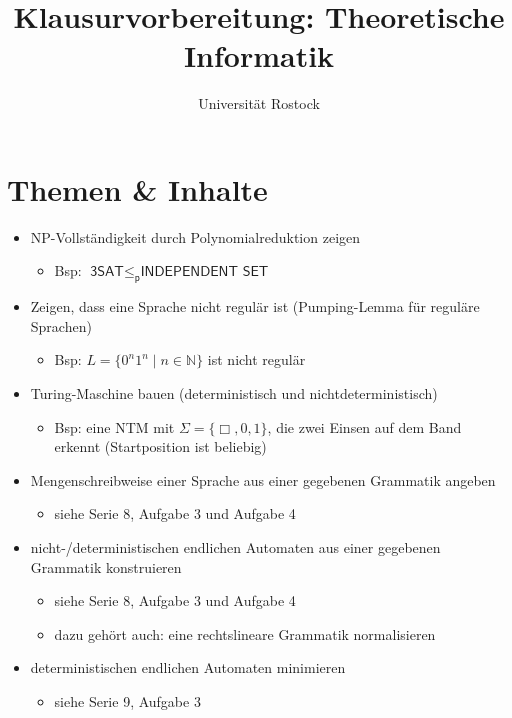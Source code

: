 \documentclass[
  a4paper,
  11pt,
]{scrartcl}
\title{Klausurvorbereitung: Theoretische Informatik}
\subtitle{Universität Rostock}
\date{}
\newcommand{\p}{\leq_{\textsf{p}}}
\newcommand{\N}{\mathbb{N}}
\newcommand{\DreiSAT}{\textsf{3SAT}}
\newcommand{\NP}{\textsf{NP}}
\newcommand{\IS}{\textsf{INDEPENDENT SET}}
\begin{document}
\maketitle

\tableofcontents

\section{Themen \& Inhalte}
\label{sec:themen}

\begin{itemize}
  \item \NP-Vollständigkeit durch Polynomialreduktion zeigen
    \begin{itemize}
      \item Bsp: $\DreiSAT \p \IS$
    \end{itemize}
  \item Zeigen, dass eine Sprache nicht regulär ist (Pumping-Lemma für reguläre
    Sprachen)
    \begin{itemize}
      \item Bsp: $L = \{ 0^n 1^n \mid n \in \N \}$ ist nicht regulär
    \end{itemize}
  \item Turing-Maschine bauen (deterministisch und nichtdeterministisch)
    \begin{itemize}
      \item Bsp: eine NTM mit $\Sigma = \{\Box, 0, 1\}$, die zwei Einsen auf dem
        Band erkennt (Startposition ist beliebig)
    \end{itemize}
  \item Mengenschreibweise einer Sprache aus einer gegebenen Grammatik angeben
    \begin{itemize}
      \item siehe Serie 8, Aufgabe 3 und Aufgabe 4
    \end{itemize}
  \item nicht-/deterministischen endlichen Automaten aus einer gegebenen
    Grammatik konstruieren
    \begin{itemize}
      \item siehe Serie 8, Aufgabe 3 und Aufgabe 4
      \item dazu gehört auch: eine rechtslineare Grammatik normalisieren
    \end{itemize}
  \item deterministischen endlichen Automaten minimieren
    \begin{itemize}
      \item siehe Serie 9, Aufgabe 3

\end{itemize}
\end{itemize}
\end{document}
